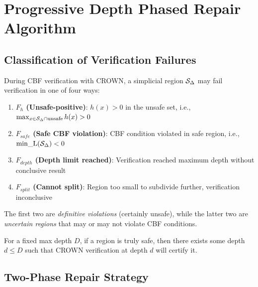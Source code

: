 \section{Progressive Depth Phased Repair Algorithm}

\subsection{Classification of Verification Failures}

During CBF verification with CROWN, a simplicial region $\mathcal{S}_\Delta$ may fail verification in one of four ways:

\begin{enumerate}
    \item \textbf{$F_h$ (Unsafe-positive)}: $h(x) > 0$ in the unsafe set, i.e., $\max_{x \in \mathcal{S}_\Delta \cap \text{unsafe}} h(x) > 0$
    \item \textbf{$F_{safe}$ (Safe CBF violation)}: CBF condition violated in safe region, i.e., $\text{min\_L}(\mathcal{S}_\Delta) < 0$
    \item \textbf{$F_{depth}$ (Depth limit reached)}: Verification reached maximum depth without conclusive result
    \item \textbf{$F_{split}$ (Cannot split)}: Region too small to subdivide further, verification inconclusive
\end{enumerate}

The first two are \emph{definitive violations} (certainly unsafe), while the latter two are \emph{uncertain regions} that may or may not violate CBF conditions.

\begin{assumption}
    For a fixed max depth $D$, if a region is truly safe, then there exists some depth $d \leq D$ such that CROWN verification at depth $d$ will certify it.
    \label{assum:depth_soundness}
\end{assumption}

\subsection{Two-Phase Repair Strategy}

